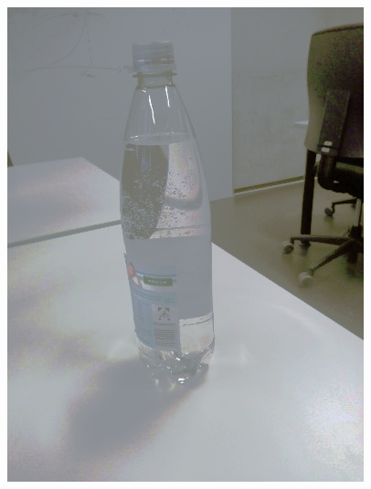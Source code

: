 \begin{appendices}
\begin{figure}[htb]
\begin{minipage}{0.19\textwidth}
\end{minipage}
\begin{minipage}{0.19\textwidth}
\includegraphics[width=\textwidth]{images/anomalien/HS/image240.jpg}
\end{minipage}
\begin{minipage}{0.19\textwidth}

\end{minipage}
\end{figure}
\end{appendices}
